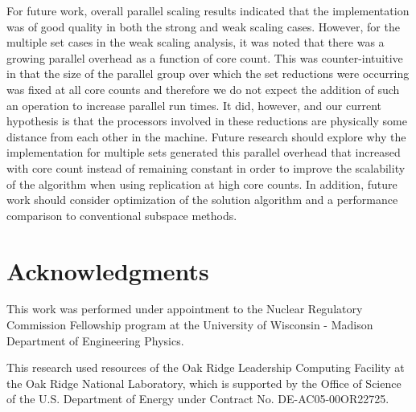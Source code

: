\documentclass{snamc2013}
\begin{document}
For future work, overall parallel scaling results indicated that the
implementation was of good quality in both the strong and weak scaling
cases. However, for the multiple set cases in the weak scaling
analysis, it was noted that there was a growing parallel overhead as a
function of core count. This was counter-intuitive in that the size of
the parallel group over which the set reductions were occurring was
fixed at all core counts and therefore we do not expect the addition
of such an operation to increase parallel run times. It did, however,
and our current hypothesis is that the processors involved in these
reductions are physically some distance from each other in the
machine. Future research should explore why the implementation for
multiple sets generated this parallel overhead that increased with
core count instead of remaining constant in order to improve the
scalability of the algorithm when using replication at high core
counts. In addition, future work should consider optimization of the
solution algorithm and a performance comparison to conventional
subspace methods.

\section*{Acknowledgments}

This work was performed under appointment to the Nuclear Regulatory
Commission Fellowship program at the University of Wisconsin - Madison
Department of Engineering Physics.

This research used resources of the Oak Ridge Leadership Computing
Facility at the Oak Ridge National Laboratory, which is supported by
the Office of Science of the U.S. Department of Energy under Contract
No. DE-AC05-00OR22725.



\end{document}
